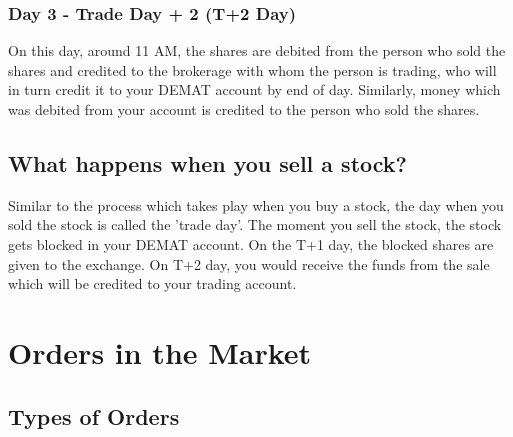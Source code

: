 \subsubsection{Day 3 - Trade Day + 2 (T+2 Day)}
On this day, around 11 AM, the shares are debited from the person who sold the shares and credited to the brokerage with whom the person is trading, who will in turn credit it to your DEMAT account by end of day. Similarly, money which was debited from your account is credited to the person who sold the shares.

\subsection{What happens when you sell a stock?}
Similar to the process which takes play when you buy a stock, the day when you sold the stock is called the 'trade day'. The moment you sell the stock, the stock gets blocked in your DEMAT account. On the T+1 day, the blocked shares are given to the exchange. On T+2 day, you would receive the funds from the sale which will be credited to your trading account.

\section{Orders in the Market}
\subsection{Types of Orders}

